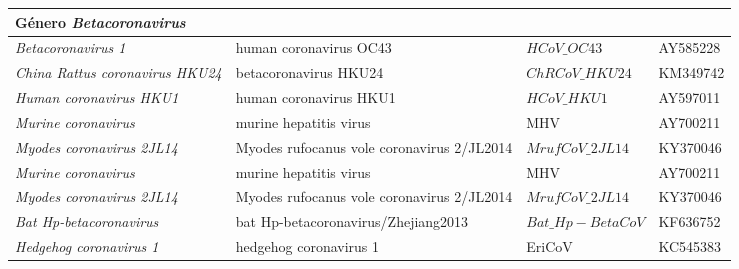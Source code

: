\begin{table}[H]
    \centering
    \scriptsize 
    \setlength{\tabcolsep}{12pt}
    \begin{tabularx}{\textwidth}{@{}>{\raggedright\arraybackslash}p{4cm}>{\raggedright\arraybackslash}p{4.5cm}>{\raggedright\arraybackslash}p{3cm}>{\raggedright\arraybackslash}X@{}}
    \midrule
    \textbf{Género \textit{Betacoronavirus}}                                                                                                                                                       \\ \midrule
    \textit{Betacoronavirus 1}                                      & human coronavirus OC43                               & $HCoV\_{OC43}$                                &  AY585228             \\
    \textit{China Rattus coronavirus HKU24}                         & betacoronavirus HKU24                                & $ChRCoV\_{HKU24}$                             &  KM349742             \\
    \textit{Human coronavirus HKU1}                                 & human coronavirus HKU1                               & $HCoV\_{HKU1}$                                &  AY597011             \\
    \textit{Murine coronavirus}                                     & murine hepatitis virus                               & MHV                                           &  AY700211             \\
    \textit{Myodes coronavirus 2JL14}                               & Myodes rufocanus vole coronavirus 2/JL2014           & $MrufCoV\_{2JL14}$                            &  KY370046             \\    
    \textit{Murine coronavirus}                                     & murine hepatitis virus                               & MHV                                           &  AY700211             \\
    \textit{Myodes coronavirus 2JL14}                               & Myodes rufocanus vole coronavirus 2/JL2014           & $MrufCoV\_{2JL14}$                            &  KY370046             \\ 
    \textit{Bat Hp-betacoronavirus}                                 & bat Hp-betacoronavirus/Zhejiang2013                  & $Bat\_{Hp-BetaCoV}$                           &  KF636752             \\    
    \textit{Hedgehog coronavirus 1}                                 & hedgehog coronavirus 1                               & EriCoV                                        &  KC545383             \\

\end{tabularx}
\end{table}
